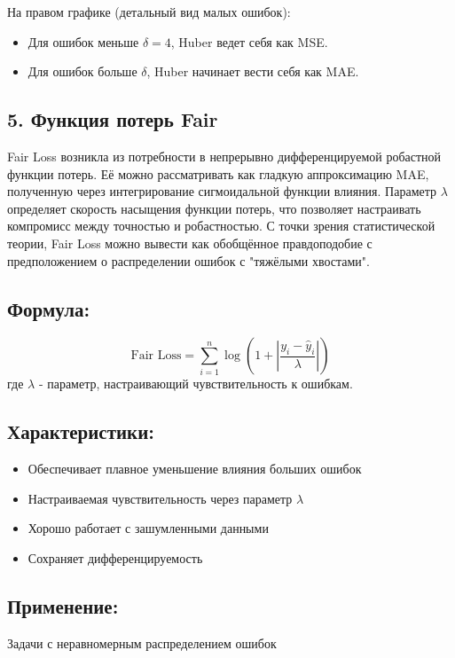 На правом графике (детальный вид малых ошибок):
\begin{itemize}
    \item Для ошибок меньше $\delta=4$, Huber ведет себя как MSE.
    \item Для ошибок больше $\delta$, Huber начинает вести себя как MAE.
\end{itemize}

\subsection*{5. Функция потерь Fair}

Fair Loss возникла из потребности в непрерывно дифференцируемой робастной функции потерь. Её можно рассматривать как гладкую аппроксимацию MAE, полученную через интегрирование сигмоидальной функции влияния. Параметр $\lambda$ определяет скорость насыщения функции потерь, что позволяет настраивать компромисс между точностью и робастностью. С точки зрения статистической теории, Fair Loss можно вывести как обобщённое правдоподобие с предположением о распределении ошибок с "тяжёлыми хвостами".

\subsection*{Формула:}

\[
    \text{Fair Loss} = \sum_{i=1}^{n} \log\left(1 + \left|\frac{y_i - \hat{y}_i}{\lambda}\right|\right)
\]
где $\lambda$ - параметр, настраивающий чувствительность к ошибкам.

\subsection*{Характеристики:}
\begin{itemize}
    \item Обеспечивает плавное уменьшение влияния больших ошибок
    \item Настраиваемая чувствительность через параметр $\lambda$
    \item Хорошо работает с зашумленными данными
    \item Сохраняет дифференцируемость
\end{itemize}

\subsection*{Применение:} Задачи с неравномерным распределением ошибок

